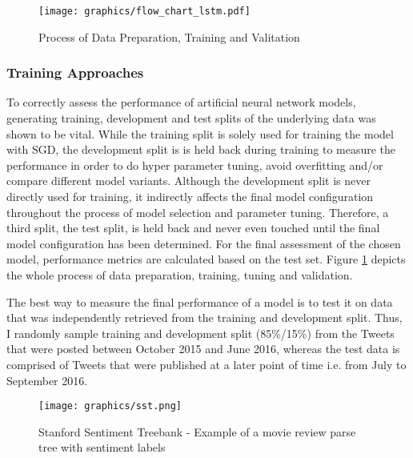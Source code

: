 \documentclass[a4paper,12pt]{article}%
\begin{document}
\begin{figure}
\captionsetup{justification=centering}
\centering
\texttt{[image: graphics/flow\_chart\_lstm.pdf]}
\caption{Process of Data Preparation, Training and Valitation \label{fig:flow_chart_lstm}}
\end{figure}

\subsubsection{Training Approaches}
To correctly assess the performance of artificial neural network models, generating training, development and test splits of the underlying data was shown to be vital. While the training split is solely used for training the model  with SGD, the development split is is held back during training to measure the performance in order to do hyper parameter tuning, avoid overfitting and/or compare different model variants. Although the development split is never directly used for training, it indirectly affects the final model configuration throughout the process of model selection and parameter tuning. Therefore, a third split, the test split, is held back and never even touched until the final model configuration has been determined. For the final assessment of the chosen model, performance metrics are calculated based on the test set. Figure \ref{fig:flow_chart_lstm} depicts the whole process of data preparation, training, tuning and validation.

The best way to measure the final performance of a model is to test it on data that was independently retrieved from the training and development split. Thus, I randomly sample training and development split (85\%/15\%) from the Tweets that were posted between October 2015 and June 2016, whereas the test data is comprised of Tweets that were published at a later point of time i.e. from July to September 2016.

\begin{figure}
\captionsetup{justification=centering}
\centering
\texttt{[image: graphics/sst.png]}
\caption[Structure of Stanford Sentiment Treebank Data]{Stanford Sentiment Treebank - Example of a movie review parse tree with sentiment labels \citep{Socher2013} \label{fig:sst}}
\end{figure}
\end{document}
